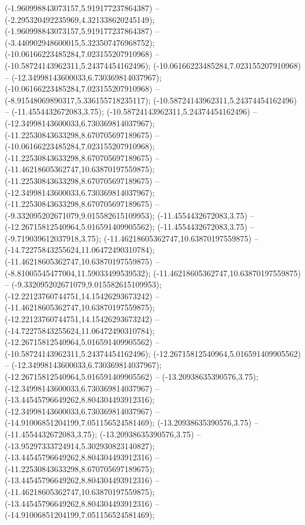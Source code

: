  (-1.960998843073157,5.919177237864387) -- (-2.295320492235969,4.321338620245149);
 (-1.960998843073157,5.919177237864387) -- (-3.440902948600015,5.323507476968752);
 (-10.06166223485284,7.023155207910968) -- (-10.58724143962311,5.24374454162496);
 (-10.06166223485284,7.023155207910968) -- (-12.34998143600033,6.730369814037967);
 (-10.06166223485284,7.023155207910968) -- (-8.91548069890317,5.336155718235117);
 (-10.58724143962311,5.24374454162496) -- (-11.4554432672083,3.75);
 (-10.58724143962311,5.24374454162496) -- (-12.34998143600033,6.730369814037967);
 (-11.22530843633298,8.670705697189675) -- (-10.06166223485284,7.023155207910968);
 (-11.22530843633298,8.670705697189675) -- (-11.46218605362747,10.63870197559875);
 (-11.22530843633298,8.670705697189675) -- (-12.34998143600033,6.730369814037967);
 (-11.22530843633298,8.670705697189675) -- (-9.332095202671079,9.015582615109953);
 (-11.4554432672083,3.75) -- (-12.26715812540964,5.016591409905562);
 (-11.4554432672083,3.75) -- (-9.719039612037918,3.75);
 (-11.46218605362747,10.63870197559875) -- (-14.72275843255624,11.06472490310784);
 (-11.46218605362747,10.63870197559875) -- (-8.81005545477004,11.59033499539532);
 (-11.46218605362747,10.63870197559875) -- (-9.332095202671079,9.015582615109953);
 (-12.22123760744751,14.15426293673242) -- (-11.46218605362747,10.63870197559875);
 (-12.22123760744751,14.15426293673242) -- (-14.72275843255624,11.06472490310784);
 (-12.26715812540964,5.016591409905562) -- (-10.58724143962311,5.24374454162496);
 (-12.26715812540964,5.016591409905562) -- (-12.34998143600033,6.730369814037967);
 (-12.26715812540964,5.016591409905562) -- (-13.20938635390576,3.75);
 (-12.34998143600033,6.730369814037967) -- (-13.44545796649262,8.804304493912316);
 (-12.34998143600033,6.730369814037967) -- (-14.91006851204199,7.051156524581469);
 (-13.20938635390576,3.75) -- (-11.4554432672083,3.75);
 (-13.20938635390576,3.75) -- (-13.95297333724914,5.302930823140827);
 (-13.44545796649262,8.804304493912316) -- (-11.22530843633298,8.670705697189675);
 (-13.44545796649262,8.804304493912316) -- (-11.46218605362747,10.63870197559875);
 (-13.44545796649262,8.804304493912316) -- (-14.91006851204199,7.051156524581469);
